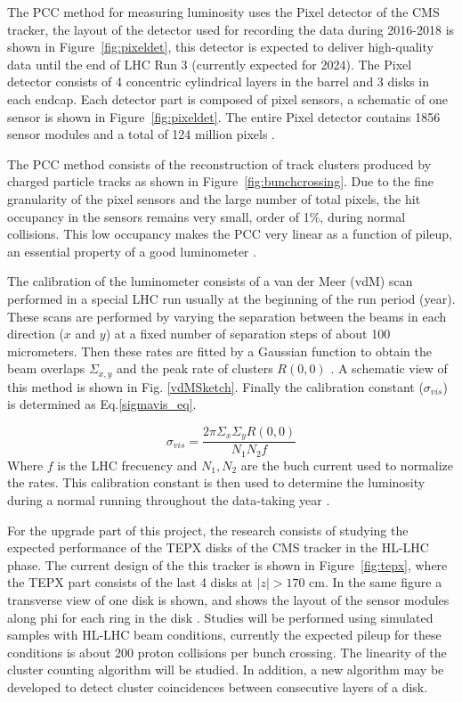 \documentclass[final,12p]{article}
\begin{document}
The PCC method for measuring luminosity uses the Pixel detector of the CMS tracker, the layout of the  detector used for recording the data during 2016-2018 is shown in Figure~\ref{fig:pixeldet},  this detector is expected to deliver high-quality data until the end of LHC Run 3 (currently expected for 2024).
The Pixel detector consists of 4 concentric cylindrical layers in the barrel and 3 disks in each endcap.
Each detector part is composed of pixel sensors, a schematic of one sensor is shown in Figure~\ref{fig:pixeldet}.
The entire Pixel detector contains 1856 sensor modules and a total of 124 million pixels \cite{TrackerGroupoftheCMS:2020bgg}.

The PCC method consists of the reconstruction of track clusters produced by charged particle tracks as shown in Figure~\ref{fig:bunchcrossing}.
Due to the fine granularity of the pixel sensors and the large number of total pixels, the hit occupancy in the sensors remains very small, order of 1\%, during normal collisions.
This low occupancy makes the PCC  very linear as a function of pileup, an essential property of a good luminometer \cite{Sirunyan:2021qkt}.

The calibration of the luminometer consists of a van der Meer (vdM) scan performed in a special LHC run usually at the beginning of the run period (year).
These scans are performed by varying the separation between the beams in each direction ($x$ and $y$) at a fixed number of separation steps of about 100 micrometers. Then these rates are fitted by a Gaussian function to obtain the beam overlaps $\Sigma_{x,y}$ and the peak rate of clusters $R(0,0)$ \cite{CMS:2018}. A schematic view of this method is shown in Fig. \ref{vdMSketch}. 
Finally the calibration constant ($\sigma_{vis}$) is determined as Eq.\ref{sigmavis_eq}.

\begin{equation}
  \sigma_{vis}=\frac{2\pi \Sigma_{x} \Sigma_{y} R(0, 0)}{N_{1}N_{2} f}
  \label{sigmavis_eq}
\end{equation}
Where $f$  is the LHC frecuency and $N_{1},N_{2}$ are the buch current used to normalize  the rates.
This calibration constant is then used to determine the luminosity during a normal running throughout the data-taking year \cite{CMS:2018}.

For the upgrade part of this project, the research consists of studying the expected performance of the TEPX disks of the CMS tracker in the HL-LHC phase.
The current design of the this tracker is shown in Figure~\ref{fig:tepx}, where the TEPX part consists of the last 4 disks at $|z|>170$ cm. In the same figure a transverse view of one disk is shown, and shows the layout of the sensor modules along phi for each ring in the disk \cite{Klein:2017nke}.
Studies will be performed using simulated samples with HL-LHC beam conditions, currently the expected pileup for these conditions is about 200 proton collisions per bunch crossing.
The linearity of the cluster counting algorithm will be studied.
In addition, a new algorithm may be developed to detect cluster coincidences between consecutive layers of a disk.
\end{document}
